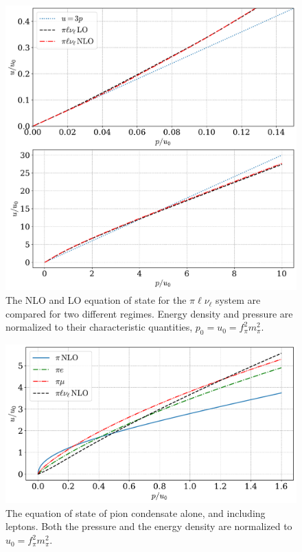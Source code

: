 \begin{figure}[p]
    \centering
    \includegraphics[width=.82\textwidth]{../scripts/figurer/pion_star/neutrino_nlo_eos.pdf}
    \caption{The NLO and LO equation of state for the $\pi \ell \nu_\ell$ system are compared for two different regimes. Energy density and pressure are normalized to their characteristic quantities, $p_0 = u_0 = f_\pi^2m_\pi^2$.}
    \label{fig: eos pi ell nu}
\end{figure}


\begin{figure}[p]
    \centering
    \includegraphics[width=.82\textwidth]{../scripts/figurer/pion_star/pion_all_eos.pdf}
    \caption{
        The equation of state of pion condensate alone, and including leptons.
        Both the pressure and the energy density are normalized to $u_0 = f_\pi^2 m_\pi^2$.
    }
    \label{fig: all eos}
\end{figure}

